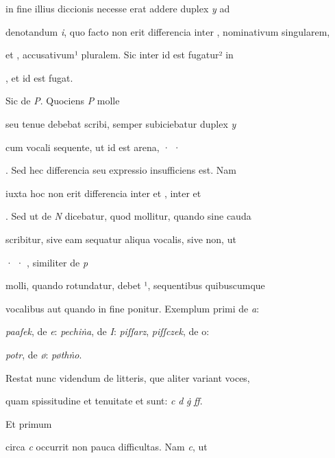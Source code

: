 in fine illius diccionis  necesse erat addere duplex \textit{y} ad 

denotandum \textit{i}, quo facto non erit differencia inter , nominativum singularem, 

et , accusativum¹ pluralem. Sic inter  id est fugatur² in 

\splitlines
{}, et  id est fugat.

\indentK Sic de \textit{P}. Quociens \textit{P} molle 

\fulllines
seu tenue debebat scribi, semper subiciebatur duplex \textit{y} 

cum vocali sequente, ut  id est arena, · · 

. Sed hec differencia seu expressio insufficiens est. Nam 

iuxta hoc non erit differencia inter  et , inter  et 

. Sed ut de \textit{N} dicebatur, quod mollitur, quando sine cauda 

scribitur, sive eam sequatur aliqua vocalis, sive non, ut 

 · · , similiter de \textit{p} 

molli, quando rotundatur, debet ¹, sequentibus quibuscumque 

vocalibus aut quando in fine ponitur. Exemplum primi de \textit{a}: 

\textit{paaſek}, de \textit{e}: \textit{pechiṅa}, de \textit{I}: \textit{piſſarz}, \textit{piſſczek}, de o\textit{}: 

\textit{potr}, de \textit{ø}: \textit{pøthṅo}. 

\indentP Restat nunc videndum de litteris, que aliter variant voces,

\splitlines
quam spissitudine et tenuitate et sunt: \textit{c} \textit{d} \textit{ġ} \textit{ﬀ}.

\indentK Et primum

\fulllines

circa \textit{c} occurrit non pauca difficultas. Nam \textit{c}, ut 

